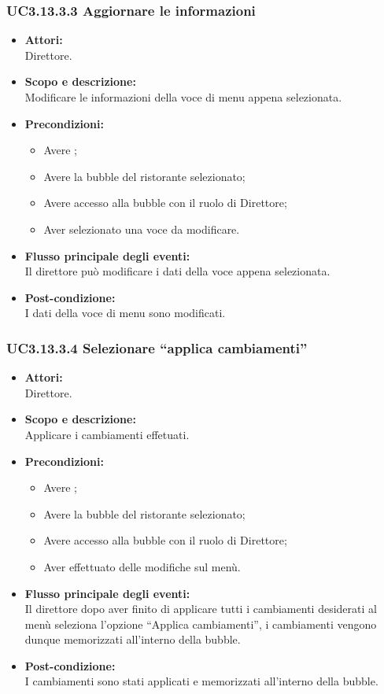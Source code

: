 \subsubsection{UC3.13.3.3 Aggiornare le informazioni} \label{UC3.13.3.3}

\begin{itemize}
	\item \textbf{Attori:}
	\\Direttore.
	\item \textbf{Scopo e descrizione:} 
	\\Modificare le informazioni della voce di menu appena selezionata.
	\item \textbf{Precondizioni:}
	\begin{itemize}
		\item Avere ;
		\item Avere la bubble del ristorante selezionato;
		\item Avere accesso alla bubble con il ruolo di Direttore;
		\item Aver selezionato una voce da modificare.
	\end{itemize}
	\item \textbf{Flusso principale degli eventi:}
	\\Il direttore può modificare i dati della voce appena selezionata.
	\item \textbf{Post-condizione:}
	\\I dati della voce di menu sono modificati.
\end{itemize}

\subsubsection{UC3.13.3.4 Selezionare “applica cambiamenti”} \label{UC3.13.3.4}

\begin{itemize}
	\item \textbf{Attori:}
	\\Direttore.
	\item \textbf{Scopo e descrizione:} 
	\\Applicare i cambiamenti effetuati.
	\item \textbf{Precondizioni:}
	\begin{itemize}
		\item Avere ;
		\item Avere la bubble del ristorante selezionato;
		\item Avere accesso alla bubble con il ruolo di Direttore;
		\item Aver effettuato delle modifiche sul menù.
	\end{itemize}
	\item \textbf{Flusso principale degli eventi:}
	\\Il direttore dopo aver finito di applicare tutti i cambiamenti desiderati al menù seleziona l’opzione “Applica cambiamenti”, i cambiamenti vengono dunque memorizzati all’interno della bubble.
	\item \textbf{Post-condizione:}
	\\I cambiamenti sono stati applicati e memorizzati all’interno della bubble.
\end{itemize}

